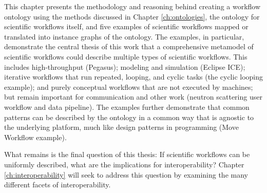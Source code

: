 This chapter presents the methodology and reasoning behind creating a workflow
ontology using the methods discussed in Chapter \ref{ch:ontologies}, the
ontology for scientific workflows itself, and five examples of scientific
workflows mapped or translated into instance graphs of the ontology. The
examples, in particular, demonstrate the central thesis of this work that a
comprehensive metamodel of scientific workflows could describe multiple types of
scientific workflows. This includes high-throughput (Pegasus); modeling and
simulation (Eclipse ICE); iterative workflows that run repeated, looping, and
cyclic tasks (the cyclic looping example); and purely conceptual workflows that
are not executed by machines; but remain important for communication and other
work (neutron scattering user workflow and data pipeline). The examples
further demonstrate that common patterns can be described by the ontology
in a common way that is agnostic to the underlying platform, much like
design patterns in programming (Move Workflow example). 

What remains is the final question of this thesis: If scientific workflows can
be uniformly described, what are the implications for interoperability? Chapter
\ref{ch:interoperability} will seek to address this question by examining the
many different facets of interoperability.
